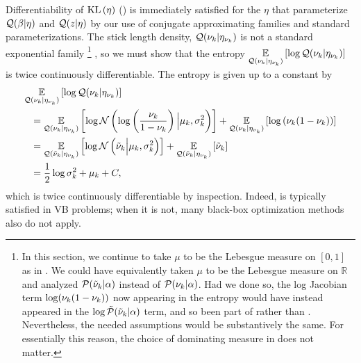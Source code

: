 Differentiability of $\mathrm{KL}\left(\eta\right)$ () is
immediately satisfied for the $\eta$ that parameterize $\mathcal{Q}(\beta \vert \eta)$
and $\mathcal{Q}(z \vert \eta)$ by our use of conjugate approximating families and
standard parameterizations.  The stick length density, $\mathcal{Q}(\nu_{k} \vert \eta_{\nu_{k}})$
is not a standard exponential family
%
\footnote{In this section, we continue to take $\mu$ to be the Lebesgue measure
on $[0,1]$ as in .  We could have equivalently taken
$\mu$ to be the Lebesgue measure on $\mathbb{R}$ and analyzed $\mathcal{P}(\tilde{\nu}_{k} \vert
\alpha)$ instead of $\mathcal{P}(\nu_{k} \vert \alpha)$.  Had we done so, the log Jacobian
term $\log (\nu_{k}(1 - \nu_{k}))$ now appearing in the entropy would have instead
appeared in the $\log \tilde{\mathcal{P}}(\tilde{\nu}_{k} \vert \alpha)$ term, and so been part of
 rather than .
Nevertheless, the needed assumptions would be substantively the same. For
essentially this reason, the choice of dominating measure in 
does not matter.}
%
, so we must show that the entropy $\underset{\mathcal{Q}(\nu_{k} \vert \eta_{\nu_{k}})}{\mathbb{E}}\left[\log \mathcal{Q}(\nu_{k}
\vert \eta_{\nu_{k}})\right]$ is  twice continuously differentiable. The entropy is given up
to a constant by
%
\begin{align*}
%
\MoveEqLeft
\expect{\q(\nuk \vert \etanuk)}{\log \q(\nuk \vert \etanuk)}
\\={}&
    \expect{\q(\nuk \vert \etanuk)}
           {\log \normdist{\log\left(\frac{\nu_\k}{1 - \nu_\k} \right)
               \Big\vert  \mu_\k, \sigma^2_\k}} +
    \expect{\q(\nuk \vert \etanuk)}
           {\log \left(\nuk (1 - \nuk)\right)}
\\={}&
   \expect{\q(\lnuk \vert \etanuk)}
          {\log \normdist{\lnuk \Big\vert  \mu_\k, \sigma^2_\k}} +
   \expect{\q(\lnuk \vert \etanuk)}{\lnuk}
\\={}&
    \frac{1}{2} \log \sigma^2_\k + \mu_\k + \const,
%
\end{align*}
%
which is twice continuously differentiable by inspection.
%
Indeed,  is typically satisfied in VB
problems; when it is not, many black-box optimization methods also do not apply.


